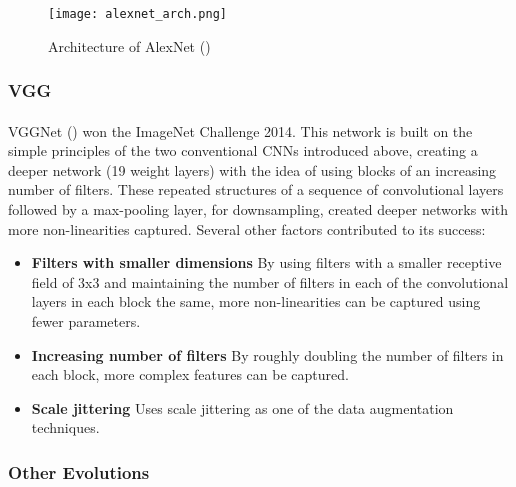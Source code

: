     \begin{figure}[hbt!]
        \centering
        \texttt{[image: alexnet\_arch.png]}
        \caption{Architecture of AlexNet (\cite{10.5555/2999134.2999257})}
        \label{fig_alexnet}
    \end{figure}


\subsubsection{VGG}
\paragraph{}
VGGNet (\cite{simonyan2014deep}) won the ImageNet Challenge 2014. This network is built on the simple principles of the two conventional \gls{CNN}s introduced above, creating a deeper network (19 weight layers) with the idea of using blocks of an increasing number of filters. These repeated structures of a sequence of convolutional layers followed by a max-pooling layer, for downsampling, created deeper networks with more non-linearities captured. Several other factors contributed to its success:

\begin{itemize}
    \item \textbf{Filters with smaller dimensions} By using filters with a smaller receptive field of $3$x$3$ and maintaining the number of filters in each of the convolutional layers in each block the same, more non-linearities can be captured using fewer parameters.
 
    \item \textbf{Increasing number of filters} By roughly doubling the number of filters in each block, more complex features can be captured.
    \item \textbf{Scale jittering} Uses scale jittering as one of the data augmentation techniques.

\end{itemize}

\subsubsection{Other Evolutions}

